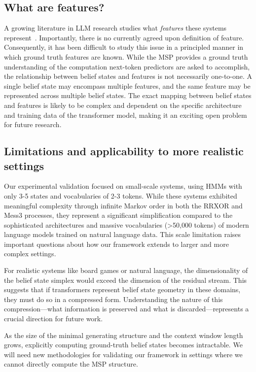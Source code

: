 \documentclass{article}
\begin{document}
\subsection{What are features?}
A growing literature in LLM research studies what \emph{features} these systems represent~\cite{bricken2023monosemanticity}. Importantly, there is no currently agreed upon definition of feature. Consequently, it has been difficult to study this issue in a principled manner in which ground truth features are known. While the MSP provides a ground truth understanding of the computation next-token predictors are asked to accomplish, the relationship between belief states and features is not necessarily one-to-one. A single belief state may encompass multiple features, and the same feature may be represented across multiple belief states. The exact mapping between belief states and features is likely to be complex and dependent on the specific architecture and training data of the transformer model, making it an exciting open problem for future research.

\subsection{Limitations and applicability to more realistic settings}

Our experimental validation focused on small-scale systems, using HMMs with only 3-5 states and vocabularies of 2-3 tokens. While these systems exhibited meaningful complexity through infinite Markov order in both the RRXOR and Mess3 processes, they represent a significant simplification compared to the sophisticated architectures and massive vocabularies (>50,000 tokens) of modern language models trained on natural language data. This scale limitation raises important questions about how our framework extends to larger and more complex settings.

For realistic systems like board games or natural language, the dimensionality of the belief state simplex would exceed the dimension of the residual stream. This suggests that if transformers represent belief state geometry in these domains, they must do so in a compressed form. Understanding the nature of this compression—what information is preserved and what is discarded—represents a crucial direction for future work.

As the size of the minimal generating structure and the context window length grows, explicitly computing ground-truth belief states becomes intractable. We will need new methodologies for validating our framework in settings where we cannot directly compute the MSP structure.
\end{document}
